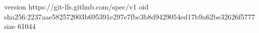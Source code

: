 version https://git-lfs.github.com/spec/v1
oid sha256:2237aae582572003b695391e297e7fbc3b8d9429054ed17b9a62be32626f5777
size 61044
